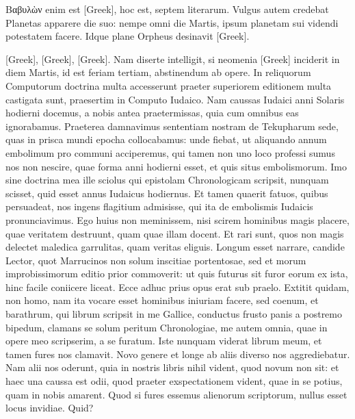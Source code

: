 \begin{parnumbers}
\textgreek{Βαβυλὼν} enim est \textgreek{[Greek]},
 hoc est, septem literarum.
\lnr{}Vulgus autem credebat Planetas apparere die suo: nempe omni
die Martis, ipsum planetam sui videndi potestatem facere.
\lnr{}Idque plane Orpheus desinavit \textgreek{[Greek]}.

	\textgreek{[Greek]},
	\textgreek{[Greek]}, \textgreek{[Greek]}.
\lnr{}Nam diserte intelligit, si neomenia \textgreek{[Greek]} inciderit in diem
Martis, id est feriam tertiam, abstinendum ab opere.
\lnr{}In reliquorum
Computorum doctrina multa accesserunt praeter superiorem editionem
multa castigata sunt, praesertim in Computo Iudaico.
\lnr{}Nam
caussas Iudaici anni Solaris hodierni docemus, a nobis antea praetermissas,
quia cum omnibus eas ignorabamus.
\lnr{}Praeterea damnavimus sententiam nostram de Tekupharum sede, quas in prisca
mundi epocha collocabamus: unde fiebat, ut aliquando annum
embolimum pro communi acciperemus, qui tamen non uno loco
professi sumus nos non nescire, quae forma anni hodierni esset, et
quis situs embolismorum.
\lnr{}Imo sine doctrina mea ille sciolus qui
epistolam Chronologicam scripsit, nunquam scisset, quid esset
annus Iudaicus hodiernus.
\lnr{}Et tamen quaerit fatuos, quibus persuadeat,
nos ingens flagitium admisisse, qui ita de embolismis Iudaicis
pronunciavimus.
\lnr{}Ego huius non meminissem, nisi scirem hominibus
magis placere, quae veritatem destruunt, quam quae illam docent.
\lnr{}Et rari sunt, quos non magis delectet maledica garrulitas,
quam veritas eliguis.
\lnr{}Longum esset narrare, candide Lector,
quot Marrucinos non solum inscitiae portentosae, sed et morum
improbissimorum editio prior commoverit: ut quis futurus sit furor
eorum ex ista, hinc facile coniicere liceat.
\lnr{}Ecce adhuc prius opus erat sub praelo.
\lnr{}Extitit quidam, non homo, nam ita vocare esset
hominibus iniuriam facere, sed coenum, et barathrum, qui librum
scripsit in me Gallice, conductus frusto panis a postremo bipedum,
clamans se solum peritum Chronologiae, me autem omnia, quae
in opere meo scripserim, a se furatum.
\lnr{}Iste nunquam viderat librum
meum, et tamen fures nos clamavit.
\lnr{}Novo genere et longe ab
aliis diverso nos aggrediebatur.
\lnr{}Nam alii nos oderunt, quia in
nostris libris nihil vident, quod novum non sit: et haec una caussa
est odii, quod praeter exspectationem vident, quae in se potius, quam
in nobis amarent.
\lnr{}Quod si fures essemus alienorum scriptorum, nullus
esset locus invidiae.
\lnr{}Quid?


\end{parnumbers}
